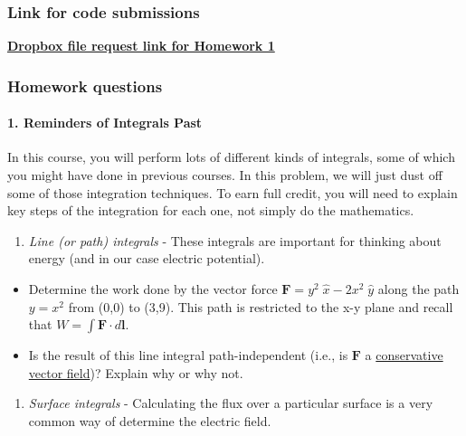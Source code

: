 \documentclass[
  letterpaperpaper,
]{article}
\providecommand{\tightlist}{%
  \setlength{\itemsep}{0pt}\setlength{\parskip}{0pt}}
\begin{document}
\hypertarget{link-for-code-submissions}{%
\subsubsection{Link for code
submissions}\label{link-for-code-submissions}}

\href{https://www.dropbox.com/request/TWSUUsUgJ7zKmQeAuDzB}{\textbf{Dropbox
file request link for Homework 1}}

\hypertarget{homework-questions}{%
\subsubsection{Homework questions}\label{homework-questions}}

\hypertarget{reminders-of-integrals-past}{%
\paragraph{1. Reminders of Integrals
Past}\label{reminders-of-integrals-past}}

In this course, you will perform lots of different kinds of integrals,
some of which you might have done in previous courses. In this problem,
we will just dust off some of those integration techniques. To earn full
credit, you will need to explain key steps of the integration for each
one, not simply do the mathematics.

\begin{enumerate}
\def\labelenumi{\arabic{enumi}.}
\tightlist
\item
  \emph{Line (or path) integrals} - These integrals are important for
  thinking about energy (and in our case electric potential).
\end{enumerate}

\begin{itemize}
\tightlist
\item
  Determine the work done by the vector force
  \(\mathbf{F} = y^2\;\hat{x} - 2x^2\;\hat{y}\) along the path \(y=x^2\)
  from (0,0) to (3,9). This path is restricted to the x-y plane and
  recall that \(W=\int \mathbf{F}\cdot d\mathbf{l}\).
\item
  Is the result of this line integral path-independent (i.e., is
  \(\mathbf{F}\) a
  \href{https://en.wikipedia.org/wiki/Conservative_vector_field}{conservative
  vector field})? Explain why or why not.
\end{itemize}

\begin{enumerate}
\def\labelenumi{\arabic{enumi}.}
\setcounter{enumi}{1}
\tightlist
\item
  \emph{Surface integrals} - Calculating the flux over a particular
  surface is a very common way of determine the electric field.
\end{enumerate}
\end{document}
